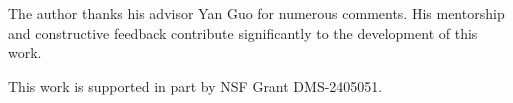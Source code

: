 \documentclass[letterpaper,reqno,10pt,twoside]{amsart}
\theoremstyle{definition}
\theoremstyle{remark}
\begin{document}
    The author thanks his advisor Yan Guo for numerous comments. His mentorship and constructive feedback contribute significantly to the development of this work.

    This work is supported in part by NSF Grant DMS-2405051. 
    









\end{document}
